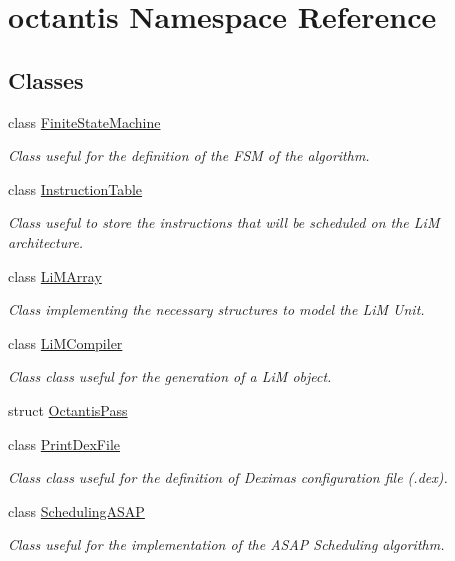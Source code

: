 \hypertarget{namespaceoctantis}{}\section{octantis Namespace Reference}
\label{namespaceoctantis}
\subsection*{Classes}
\begin{DoxyCompactItemize}
\item 
class \hyperlink{classoctantis_1_1FiniteStateMachine}{Finite\+State\+Machine}
\begin{DoxyCompactList}\small\item\em Class useful for the definition of the F\+SM of the algorithm. \end{DoxyCompactList}\item 
class \hyperlink{classoctantis_1_1InstructionTable}{Instruction\+Table}
\begin{DoxyCompactList}\small\item\em Class useful to store the instructions that will be scheduled on the LiM architecture. \end{DoxyCompactList}\item 
class \hyperlink{classoctantis_1_1LiMArray}{Li\+M\+Array}
\begin{DoxyCompactList}\small\item\em Class implementing the necessary structures to model the LiM Unit. \end{DoxyCompactList}\item 
class \hyperlink{classoctantis_1_1LiMCompiler}{Li\+M\+Compiler}
\begin{DoxyCompactList}\small\item\em Class class useful for the generation of a LiM object. \end{DoxyCompactList}\item 
struct \hyperlink{structoctantis_1_1OctantisPass}{Octantis\+Pass}
\item 
class \hyperlink{classoctantis_1_1PrintDexFile}{Print\+Dex\+File}
\begin{DoxyCompactList}\small\item\em Class class useful for the definition of Dexima\textquotesingle{}s configuration file (.dex). \end{DoxyCompactList}\item 
class \hyperlink{classoctantis_1_1SchedulingASAP}{Scheduling\+A\+S\+AP}
\begin{DoxyCompactList}\small\item\em Class useful for the implementation of the A\+S\+AP Scheduling algorithm. \end{DoxyCompactList}\end{DoxyCompactItemize}
